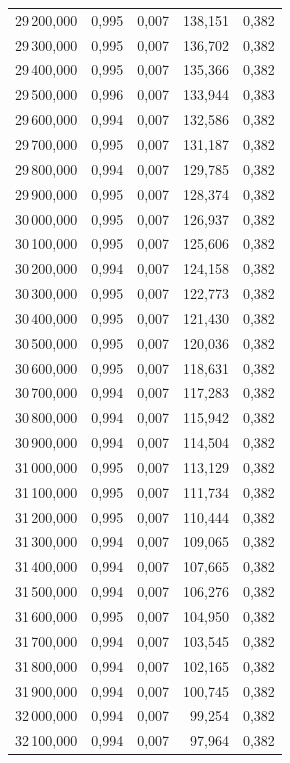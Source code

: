 \begin{longtable}{rrrrr}
29\,200,000 & 0,995 & 0,007 & 138,151 & 0,382\\
29\,300,000 & 0,995 & 0,007 & 136,702 & 0,382\\
29\,400,000 & 0,995 & 0,007 & 135,366 & 0,382\\
29\,500,000 & 0,996 & 0,007 & 133,944 & 0,383\\
29\,600,000 & 0,994 & 0,007 & 132,586 & 0,382\\
29\,700,000 & 0,995 & 0,007 & 131,187 & 0,382\\
29\,800,000 & 0,994 & 0,007 & 129,785 & 0,382\\
29\,900,000 & 0,995 & 0,007 & 128,374 & 0,382\\
30\,000,000 & 0,995 & 0,007 & 126,937 & 0,382\\
30\,100,000 & 0,995 & 0,007 & 125,606 & 0,382\\
30\,200,000 & 0,994 & 0,007 & 124,158 & 0,382\\
30\,300,000 & 0,995 & 0,007 & 122,773 & 0,382\\
30\,400,000 & 0,995 & 0,007 & 121,430 & 0,382\\
30\,500,000 & 0,995 & 0,007 & 120,036 & 0,382\\
30\,600,000 & 0,995 & 0,007 & 118,631 & 0,382\\
30\,700,000 & 0,994 & 0,007 & 117,283 & 0,382\\
30\,800,000 & 0,994 & 0,007 & 115,942 & 0,382\\
30\,900,000 & 0,994 & 0,007 & 114,504 & 0,382\\
31\,000,000 & 0,995 & 0,007 & 113,129 & 0,382\\
31\,100,000 & 0,995 & 0,007 & 111,734 & 0,382\\
31\,200,000 & 0,995 & 0,007 & 110,444 & 0,382\\
31\,300,000 & 0,994 & 0,007 & 109,065 & 0,382\\
31\,400,000 & 0,994 & 0,007 & 107,665 & 0,382\\
31\,500,000 & 0,994 & 0,007 & 106,276 & 0,382\\
31\,600,000 & 0,995 & 0,007 & 104,950 & 0,382\\
31\,700,000 & 0,994 & 0,007 & 103,545 & 0,382\\
31\,800,000 & 0,994 & 0,007 & 102,165 & 0,382\\
31\,900,000 & 0,994 & 0,007 & 100,745 & 0,382\\
32\,000,000 & 0,994 & 0,007 & 99,254 & 0,382\\
32\,100,000 & 0,994 & 0,007 & 97,964 & 0,382\\

\end{longtable}
